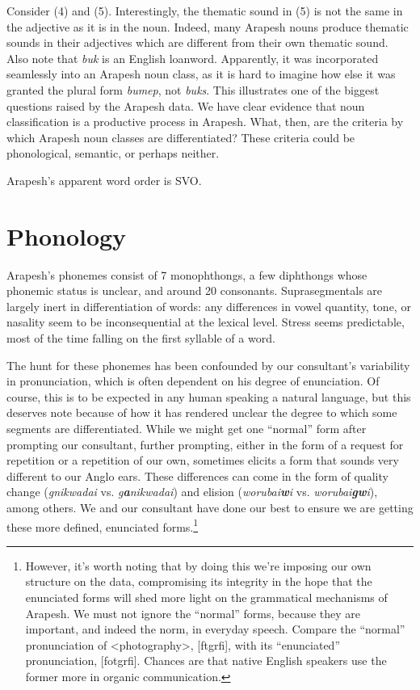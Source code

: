 \documentclass[pdftex,12pt,letterpaper]{article}
\let\ipa\textipa
\begin{document}
Consider (4) and (5). Interestingly, the thematic sound in (5) is not the same in the adjective as it is in the noun. Indeed, many Arapesh nouns produce thematic sounds in their adjectives which are different from their own thematic sound. Also note that \emph{buk} is an English loanword. Apparently, it was incorporated seamlessly into an Arapesh noun class, as it is hard to imagine how else it was granted the plural form \emph{bumep}, not \emph{buks}. This illustrates one of the biggest questions raised by the Arapesh data. We have clear evidence that noun classification is a productive process in Arapesh. What, then, are the criteria by which Arapesh noun classes are differentiated? These criteria could be phonological, semantic, or perhaps neither.

Arapesh's apparent word order is SVO.

\section{Phonology}

Arapesh's phonemes consist of 7 monophthongs, a few diphthongs whose phonemic status is unclear, and around 20 consonants. Suprasegmentals are largely inert in differentiation of words: any differences in vowel quantity, tone, or nasality seem to be inconsequential at the lexical level. Stress seems predictable, most of the time falling on the first syllable of a word. 

The hunt for these phonemes has been confounded by our consultant's variability in pronunciation, which is often dependent on his degree of enunciation. Of course, this is to be expected in any human speaking a natural language, but this deserves note because of how it has rendered unclear the degree to which some segments are differentiated. While we might get one ``normal'' form after prompting our consultant, further prompting, either in the form of a request for repetition or a repetition of our own, sometimes elicits a form that sounds very different to our Anglo ears. These differences can come in the form of quality change (\emph{g\textbf{\ipa{@}}nikwadai} vs. \emph{g\textbf{a}nikwadai}) and elision (\emph{worubai\textbf{w}i} vs. \emph{worubai\textbf{gw}i}), among others. We and our consultant have done our best to ensure we are getting these more defined, enunciated forms.\footnote{However, it's worth noting that by doing this we're imposing our own structure on the data, compromising its integrity in the hope that the enunciated forms will shed more light on the grammatical mechanisms of Arapesh. We must not ignore the ``normal'' forms, because they are important, and indeed the norm, in everyday speech. Compare the ``normal'' pronunciation of \textless photography\textgreater, {[f\ipa{@}t\ipa{O}gr\ipa{@}fi]}, with its ``enunciated'' pronunciation, {[fot\ipa{O}gr\ipa{@}fi]}. Chances are that native English speakers use the former more in organic communication.}
\end{document}
